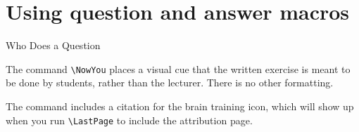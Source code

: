 \documentclass[10pt]{beamer}
\begin{document}
\section{Using question and answer macros}
\frame{\tableofcontents[currentsection]}
\begin{frame}[t]{Who Does a Question}

\NowYou The command \texttt{\textbackslash NowYou} places a visual cue that the written exercise is meant to be done by students, rather than the lecturer. There is no other formatting.\vfill

The command includes a citation for the brain training icon, which will show up when you run \texttt{\textbackslash LastPage} to include the attribution page.
\end{frame}
\end{document}
